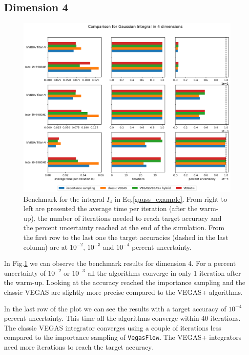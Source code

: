 \documentclass[../main/main.tex]{subfiles}
\begin{document}
\subsection{Dimension 4}

\begin{figure}
	\centering
	\includegraphics[width=\textwidth]{../images/gauss4d_final.png}
	\caption{Benchmark  for the integral $I_4$ in Eq.\eqref{gauss_example}. From right to left are presented the average time per iteration (after the warm-up), the number of iterations needed to reach target accuracy and the percent uncertainty reached at the end of the simulation. From the first row to the last one the target accuracies (dashed in the last column) are at $10^{-2}$, $10^{-3}$ and $10^{-4}$ percent uncertainty.}
	\label{gauss4d}
\end{figure}
In Fig.\ref{gauss4d} we can observe the benchmark results for dimension 4.
For a percent uncertainty of $10^{-2}$  or $10^{-3}$ all the algorithms converge in only 1 iteration after the warm-up. Looking at the accuracy reached the importance sampling and the classic VEGAS  are slightly more precise compared to the VEGAS+ algorithms.

In the last row of the plot we can see the results with a target accuracy of $10^{-4}$ percent uncertainty. 
This time all the algorithms converge within 40 iterations. The classic VEGAS integrator converges using a couple of  iterations less compared to the importance sampling of \texttt{VegasFlow}. The VEGAS+ integrators need more iterations to reach the target accuracy.
\end{document}
